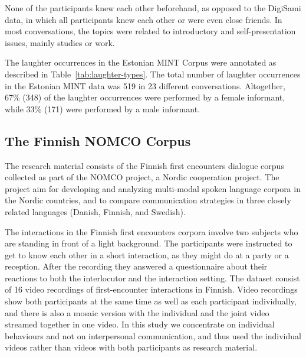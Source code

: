 \documentclass[10pt,journal,compsoc]{IEEEtran}
\begin{document}
None of the participants knew each other beforehand, as opposed to the DigiSami data, in which all participants knew each other or were even close friends. In most conversations, the topics were related to introductory and self-presentation issues, mainly studies or work.

The laughter occurrences in the Estonian MINT Corpus were annotated as described in Table~\ref{tab:laughter-types}. The total number of laughter occurrences in the Estonian MINT data was 519 in 23 different conversations.
Altogether, 67\% (348) of the laughter occurrences were performed by a female informant, while 33\% (171) were performed by a male informant.

\subsection{The Finnish NOMCO Corpus}
\label{sec:finnish-nomco-corpus}
The research material consists of the Finnish first encounters dialogue corpus collected as part of the NOMCO project, a Nordic cooperation project. The project aim for developing and analyzing multi-modal spoken language corpora in the Nordic countries, and to compare communication strategies in three closely related languages (Danish, Finnish, and Swedish).

The interactions in the Finnish first encounters corpora involve two subjects who are standing in front of a light background. The participants were instructed to get to know each other in a short interaction, as they might do at a party or a reception. After the recording they answered a questionnaire about their reactions to both the interlocutor and the interaction setting. The dataset consist of 16 video recordings of first-encounter interactions in Finnish. Video recordings show both participants at the same time as well as each participant individually, and there is also a mosaic version with the individual and the joint video streamed together in one video. In this study we concentrate on individual behaviours and not on interpersonal communication, and thus used the individual videos rather than videos with both participants as research material.
\end{document}
